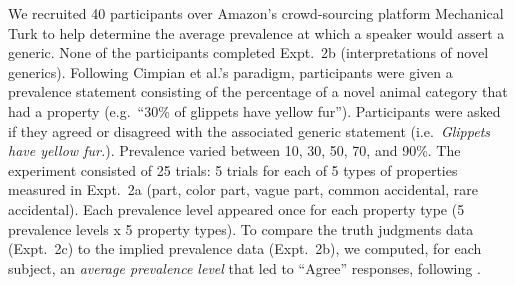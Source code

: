 \documentclass{pnastwo}
\begin{document}
\begin{article}
\begin{materials}
We recruited 40 participants over Amazon's crowd-sourcing platform Mechanical Turk to help determine the average prevalence at which a speaker would assert a generic.  
None of the participants completed Expt.~2b (interpretations of novel generics).
Following Cimpian et al.'s paradigm, participants were given a prevalence statement consisting of the percentage of a novel animal category that had a property (e.g.~``30\% of glippets have yellow fur''). 
Participants were asked if they agreed or disagreed with the associated generic statement (i.e.~\emph{Glippets have yellow fur.}).
Prevalence varied between 10, 30, 50, 70, and 90\%.
The experiment consisted of 25 trials: 5 trials for each of 5 types of properties measured in Expt.~2a (part, color part, vague part, common accidental, rare accidental). 
Each prevalence level appeared once for each property type (5 prevalence levels x 5 property types). 
To compare the truth judgments data (Expt.~2c) to the implied prevalence data (Expt.~2b), we computed, for each subject, an \emph{average prevalence level} that led to ``Agree'' responses, following \cite{Cimpian2010}.

\end{materials}
\end{article}
\end{document}
